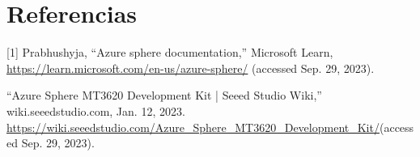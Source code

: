 \section{Referencias}
[1] Prabhushyja, “Azure sphere documentation,” Microsoft Learn, \href{https://learn.microsoft.com/en-us/azure-sphere/}{https://learn.microsoft.com/en-us/azure-sphere/} (accessed Sep. 29, 2023). \par
[2]“Azure Sphere MT3620 Development Kit | Seeed Studio Wiki,” wiki.seeedstudio.com, Jan. 12, 2023. \href{https://wiki.seeedstudio.com/Azure_Sphere_MT3620_Development_Kit/}{https://wiki.seeedstudio.com/Azure\_Sphere\_MT3620\_Development\_Kit/}(accessed Sep. 29, 2023).
‌